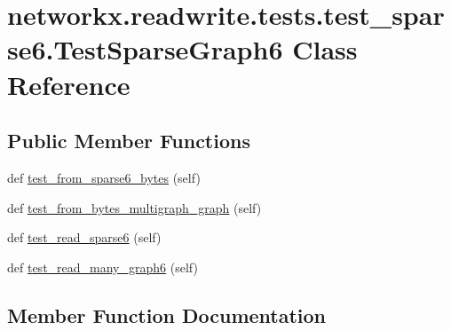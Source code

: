 \hypertarget{classnetworkx_1_1readwrite_1_1tests_1_1test__sparse6_1_1TestSparseGraph6}{}\section{networkx.\+readwrite.\+tests.\+test\+\_\+sparse6.\+Test\+Sparse\+Graph6 Class Reference}
\label{classnetworkx_1_1readwrite_1_1tests_1_1test__sparse6_1_1TestSparseGraph6}
\subsection*{Public Member Functions}
\begin{DoxyCompactItemize}
\item 
def \hyperlink{classnetworkx_1_1readwrite_1_1tests_1_1test__sparse6_1_1TestSparseGraph6_a4f153554032ef12fc21a7754220cb053}{test\+\_\+from\+\_\+sparse6\+\_\+bytes} (self)
\item 
def \hyperlink{classnetworkx_1_1readwrite_1_1tests_1_1test__sparse6_1_1TestSparseGraph6_a45bdc75bbd3c0f00793e20553d1d539b}{test\+\_\+from\+\_\+bytes\+\_\+multigraph\+\_\+graph} (self)
\item 
def \hyperlink{classnetworkx_1_1readwrite_1_1tests_1_1test__sparse6_1_1TestSparseGraph6_a3056df66f2107b06076c7af27ebc92f8}{test\+\_\+read\+\_\+sparse6} (self)
\item 
def \hyperlink{classnetworkx_1_1readwrite_1_1tests_1_1test__sparse6_1_1TestSparseGraph6_a88072fb7fa43fb1f0d5b2ad52ac4f432}{test\+\_\+read\+\_\+many\+\_\+graph6} (self)
\end{DoxyCompactItemize}


\subsection{Member Function Documentation}
\mbox{\label{classnetworkx_1_1readwrite_1_1tests_1_1test__sparse6_1_1TestSparseGraph6_a45bdc75bbd3c0f00793e20553d1d539b}} 

